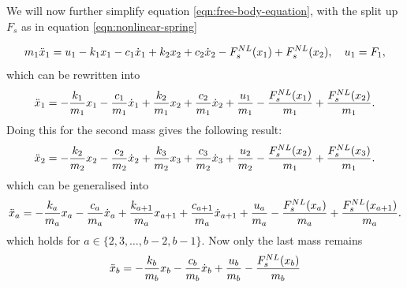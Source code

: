 We will now further simplify equation \eqref{eqn:free-body-equation}, with the split up $F_s$ as in equation \eqref{eqn:nonlinear-spring}

\begin{equation*}
    m_1\Ddot{x}_1 = u_1 - k_1x_1 - c_1\dot{x}_1 + k_2x_2 + c_2\dot{x}_2 - F_s^{NL}(x_1) + F_s^{NL}(x_2), \quad u_1 = F_1,
\end{equation*}
which can be rewritten into
\begin{equation}\label{eqn:mass-spring-damper-first-mass-eom}
    \Ddot{x}_1 = -\frac{k_1}{m_1}x_1 -\frac{c_1}{m_1}\dot{x}_1 + \frac{k_2}{m_1}x_2 + \frac{c_2}{m_1}\dot{x}_2 + \frac{u_1}{m_1} - \frac{F_s^{NL}(x_1)}{m_1} + \frac{F_s^{NL}(x_2)}{m_1}.
\end{equation}
Doing this for the second mass gives the following result:
\begin{equation*}
    \Ddot{x}_2 = -\frac{k_2}{m_2}x_2 - \frac{c_2}{m_2}\dot{x}_2 + \frac{k_3}{m_2}x_3 + \frac{c_3}{m_2}\dot{x}_3 + \frac{u_2}{m_2} - \frac{F_s^{NL}(x_2)}{m_1} + \frac{F_s^{NL}(x_3)}{m_1}.
\end{equation*}
which can be generalised into
\begin{equation}\label{eqn:mass-spring-damper-centre-mass-eom}
    \Ddot{x}_a =  -\frac{k_a}{m_a}x_a - \frac{c_a}{m_a}\dot{x}_a + \frac{k_{a+1}}{m_a}x_{a+1} + \frac{c_{a+1}}{m_a}\dot{x}_{a+1} + \frac{u_a}{m_a} - \frac{F_s^{NL}(x_a)}{m_a} + \frac{F_s^{NL}(x_{a+1})}{m_a}.
\end{equation}
which holds for $a \in \{2,3,\dots,b-2,b-1\}$. Now only the last mass remains
\begin{equation}\label{eqn:mass-spring-damper-last-mass-eom}
    \Ddot{x}_b = -\frac{k_b}{m_b}x_b - \frac{c_b}{m_b}\dot{x}_b + \frac{u_b}{m_b} - \frac{F_s^{NL}(x_b)}{m_b}
\end{equation}

